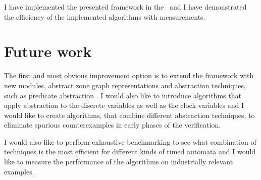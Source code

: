 I have implemented the presented framework in the \ttmcfw\ and I have demonstrated the efficiency of the implemented algorithms with measurements.

\section{Future work}

The first and most obvious improvement option is to extend the framework with new modules, abstract zone graph representations and abstraction techniques, such as predicate abstraction \cite{Graf97a}. I would also like to introduce algorithms that apply abstraction to the discrete variables as well as the clock variables and I would like to create algorithms, that combine different abstraction techniques, to eliminate spurious counterexamples in early phases of the verification.

I would also like to perform exhaustive benchmarking to see what combination of techniques is the most efficient for different kinds of timed automata and I would like to measure the performance of the algorithms on industrially relevant examples.